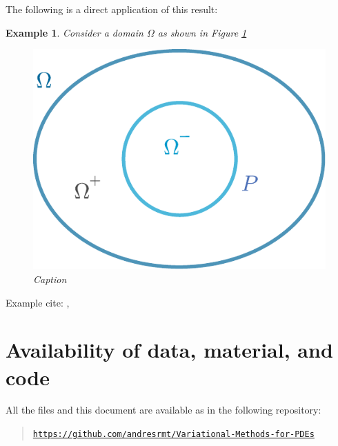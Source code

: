 \documentclass[a4paper,doc,11pt]{article}
\newtheorem{example}[theorem]{Example}
\begin{document}
The following is a direct application of this result:

\begin{example}
    Consider a domain \(\Omega\) as shown in Figure \ref{fig:3-Split}
    \begin{figure}
        \centering
        \includegraphics[scale=0.5]{Fig-3_Domains.pdf}
        \caption{Caption}
        \label{fig:3-Split}
    \end{figure}
\end{example}




\vspace{2\baselineskip}

Example cite:
\citet{Brezis2010}, \citep{Brezis2010}







\section*{Availability of data, material, and code}
{

All the files and this document are available as in the following repository:
\begin{quote}
    \noindent \href{https://github.com/andresrmt/Variational-Methods-for-PDEs}{\texttt{https://github.com/andresrmt/Variational-Methods-for-PDEs}}
\end{quote}



}

\newpage



\end{document}

